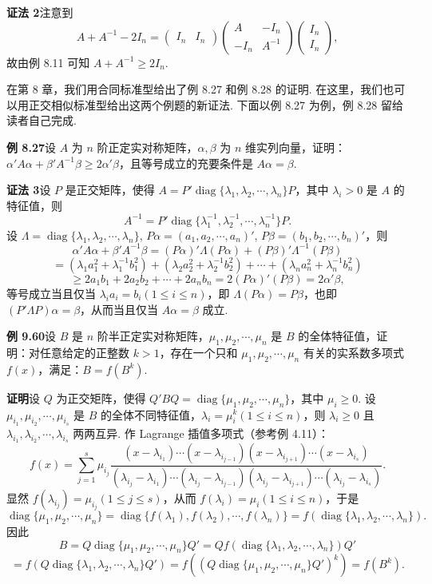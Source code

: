 \documentclass[UTF8,12pt,a4paper,fontset=fandol]{ctexart}
\begin{document}
\noindent\textbf{证法 2}\quad 注意到
\[
A+A^{-1}-2I_n=
\begin{pmatrix}
I_n&I_n
\end{pmatrix}
\begin{pmatrix}
A&-I_n\\
-I_n&A^{-1}
\end{pmatrix}
\begin{pmatrix}
I_n\\
I_n
\end{pmatrix},
\]
故由例 8.11 可知 $A+A^{-1}\ge2I_n$.

在第 8 章，我们用合同标准型给出了例 8.27 和例 8.28 的证明. 在这里，我们也可以用正交相似标准型给出这两个例题的新证法. 下面以例 8.27 为例，例 8.28 留给读者自己完成.

\noindent\textbf{例 8.27}\quad 设 $A$ 为 $n$ 阶正定实对称矩阵，$\alpha,\beta$ 为 $n$ 维实列向量，证明：$\alpha'A\alpha+\beta'A^{-1}\beta\ge2\alpha'\beta$，且等号成立的充要条件是 $A\alpha=\beta$.

\noindent\textbf{证法 3}\quad 设 $P$ 是正交矩阵，使得 $A=P'\operatorname{diag}\{\lambda_1,\lambda_2,\cdots,\lambda_n\}P$，其中 $\lambda_i>0$ 是 $A$ 的特征值，则
\[
A^{-1}=P'\operatorname{diag}\{\lambda_1^{-1},\lambda_2^{-1},\cdots,\lambda_n^{-1}\}P.
\]
设 $\Lambda=\operatorname{diag}\{\lambda_1,\lambda_2,\cdots,\lambda_n\}$, $P\alpha=(a_1,a_2,\cdots,a_n)'$, $P\beta=(b_1,b_2,\cdots,b_n)'$，则
\[
\alpha'A\alpha+\beta'A^{-1}\beta=(P\alpha)'\Lambda(P\alpha)+(P\beta)'\Lambda^{-1}(P\beta)
\]
\[
=(\lambda_1a_1^2+\lambda_1^{-1}b_1^2)+(\lambda_2a_2^2+\lambda_2^{-1}b_2^2)+\cdots+(\lambda_na_n^2+\lambda_n^{-1}b_n^2)
\]
\[
\ge2a_1b_1+2a_2b_2+\cdots+2a_nb_n=2(P\alpha)'(P\beta)=2\alpha'\beta,
\]
等号成立当且仅当 $\lambda_ia_i=b_i(1\le i\le n)$，即 $\Lambda(P\alpha)=P\beta$，也即 $(P'\Lambda P)\alpha=\beta$，从而当且仅当 $A\alpha=\beta$ 成立.

\noindent\textbf{例 9.60}\quad 设 $B$ 是 $n$ 阶半正定实对称矩阵，$\mu_1,\mu_2,\cdots,\mu_n$ 是 $B$ 的全体特征值，证明：对任意给定的正整数 $k>1$，存在一个只和 $\mu_1,\mu_2,\cdots,\mu_n$ 有关的实系数多项式 $f(x)$，满足：$B=f(B^k)$.

\noindent\textbf{证明}\quad 设 $Q$ 为正交矩阵，使得 $Q'BQ=\operatorname{diag}\{\mu_1,\mu_2,\cdots,\mu_n\}$，其中 $\mu_i\ge0$. 设 $\mu_{i_1},\mu_{i_2},\cdots,\mu_{i_s}$ 是 $B$ 的全体不同特征值，$\lambda_i=\mu_i^k(1\le i\le n)$，则 $\lambda_i\ge0$ 且 $\lambda_{i_1},\lambda_{i_2},\cdots,\lambda_{i_s}$ 两两互异. 作 Lagrange 插值多项式（参考例 4.11）：
\[
f(x)=\sum_{j=1}^s\mu_{i_j}
\frac{(x-\lambda_{i_1})\cdots(x-\lambda_{i_{j-1}})(x-\lambda_{i_{j+1}})\cdots(x-\lambda_{i_s})}
{(\lambda_{i_j}-\lambda_{i_1})\cdots(\lambda_{i_j}-\lambda_{i_{j-1}})(\lambda_{i_j}-\lambda_{i_{j+1}})\cdots(\lambda_{i_j}-\lambda_{i_s})}.
\]
显然 $f(\lambda_{i_j})=\mu_{i_j}(1\le j\le s)$，从而 $f(\lambda_i)=\mu_i(1\le i\le n)$，于是
\[
\operatorname{diag}\{\mu_1,\mu_2,\cdots,\mu_n\}
=\operatorname{diag}\{f(\lambda_1),f(\lambda_2),\cdots,f(\lambda_n)\}
=f(\operatorname{diag}\{\lambda_1,\lambda_2,\cdots,\lambda_n\}).
\]
因此
\[
B=Q\operatorname{diag}\{\mu_1,\mu_2,\cdots,\mu_n\}Q'
=Qf(\operatorname{diag}\{\lambda_1,\lambda_2,\cdots,\lambda_n\})Q'
\]
\[
=f(Q\operatorname{diag}\{\lambda_1,\lambda_2,\cdots,\lambda_n\}Q')
=f((Q\operatorname{diag}\{\mu_1,\mu_2,\cdots,\mu_n\}Q')^k)=f(B^k).
\]
\end{document}
